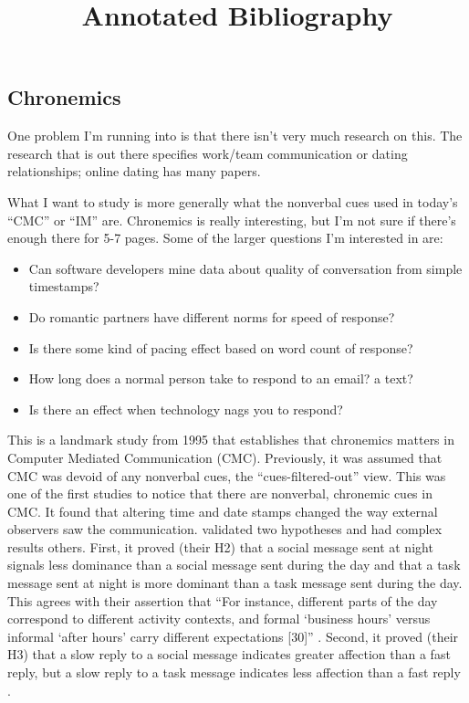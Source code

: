 \documentclass[
]{article}
\title{Annotated Bibliography}
\author{}
\date{\vspace{-2.5em}}
\providecommand{\tightlist}{%
  \setlength{\itemsep}{0pt}\setlength{\parskip}{0pt}}
\begin{document}
\maketitle

\hypertarget{chronemics}{%
\subsection{Chronemics}\label{chronemics}}

One problem I'm running into is that there isn't very much research on
this. The research that is out there specifies work/team communication
or dating relationships; online dating has many papers.

What I want to study is more generally what the nonverbal cues used in
today's ``CMC'' or ``IM'' are. Chronemics is really interesting, but I'm
not sure if there's enough there for 5-7 pages. Some of the larger
questions I'm interested in are:

\begin{itemize}
\tightlist
\item
  Can software developers mine data about quality of conversation from
  simple timestamps?
\item
  Do romantic partners have different norms for speed of response?
\item
  Is there some kind of pacing effect based on word count of response?
\item
  How long does a normal person take to respond to an email? a text?
\item
  Is there an effect when technology nags you to respond?
\end{itemize}

\textbf{}

This is a landmark study from 1995 that establishes that chronemics
matters in Computer Mediated Communication (CMC). Previously, it was
assumed that CMC was devoid of any nonverbal cues, the
``cues-filtered-out'' view. This was one of the first studies to notice
that there are nonverbal, chronemic cues in CMC. It found that altering
time and date stamps changed the way external observers saw the
communication. \textcite{walther95} validated two hypotheses and had
complex results others. First, it proved (their H2) that a social
message sent at night signals less dominance than a social message sent
during the day and that a task message sent at night is more dominant
than a task message sent during the day. This agrees with their
assertion that ``For instance, different parts of the day correspond to
different activity contexts, and formal `business hours' versus informal
`after hours' carry different expectations {[}30{]}'' \autocite[
361]{walther95}. Second, it proved (their H3) that a slow reply to a
social message indicates greater affection than a fast reply, but a slow
reply to a task message indicates less affection than a fast reply
\autocite[ 370]{walther95}.
\end{document}
